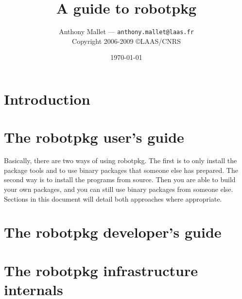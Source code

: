 \documentclass[a4paper,11pt]{book}
\title{A guide to robotpkg}
\author{
   Anthony Mallet --- {\tt anthony.mallet@laas.fr}\\[1em]
   Copyright 2006-2009 \copyright LAAS/CNRS
}
\date{\today}
\begin{document}

\frontmatter
\maketitle
\tableofcontents
\mainmatter

\chapter{Introduction}
\label{chapter:introduction}


\chapter{The robotpkg user's guide}
\label{chapter:user}

Basically, there are two ways of using robotpkg.  The  first is to only install
the  package tools and to  use binary packages that  someone else has prepared.
The second way is  to install the  programs from source. Then  you are  able to
build your own packages,  and you can  still use  binary packages from  someone
else. Sections in this document will detail both approaches where appropriate.






\chapter{The robotpkg developer's guide}
\label{chapter:developer}

\chapter{The robotpkg infrastructure internals}
\label{chapter:internal}
\end{document}
